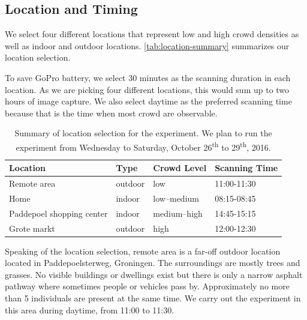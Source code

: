 \subsection{Location and Timing} %
\label{sub:location_and_timing}
We select four different locations that represent low and high crowd densities as well as indoor and outdoor locations. \autoref{tab:location-summary} summarizes our location selection.

To save GoPro battery, we select 30 minutes as the scanning duration in each location. As we are picking four different locations, this would sum up to two hours of image capture. We also select daytime as the preferred scanning time because that is the time when most crowd are observable.


\begin{table}[]
\begin{adjustwidth}{-1cm}{}
\centering
\caption[Summary of location selection]
{Summary of location selection for the experiment. We plan to run the experiment from Wednesday to Saturday, October 26\textsuperscript{th} to 29\textsuperscript{th}, 2016.}
\label{tab:location-summary}
\begin{tabular}{llll} \toprule
Location                  & Type    & Crowd Level & Scanning Time \\ \midrule
Remote area               & outdoor & low         & 11:00-11:30   \\
Home                      & indoor  & low--medium  & 08:15-08:45   \\
Paddepoel shopping center & indoor  & medium--high & 14:45-15:15   \\
Grote markt               & outdoor & high        & 12:00-12:30  \\ \bottomrule
\end{tabular}
\end{adjustwidth}
\end{table}



Speaking of the location selection, remote area is a far-off outdoor location located in Paddepoelsterweg, Groningen. The surroundings are mostly trees and grasses. No visible buildings or dwellings exist but there is only a narrow asphalt pathway where sometimes people or vehicles pass by. Approximately no more than 5 individuals are present at the same time. We carry out the experiment in this area during daytime, from 11:00 to 11:30.

